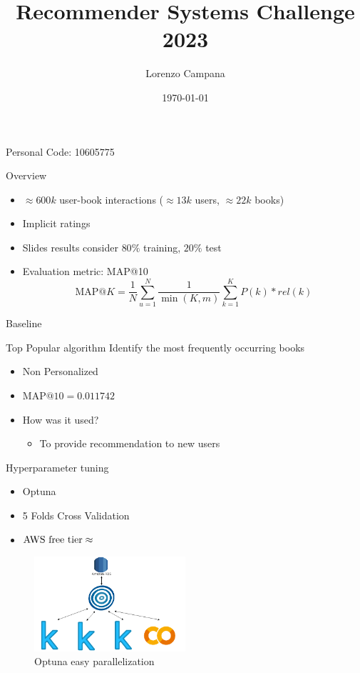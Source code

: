 \documentclass{beamer}
\title{Recommender Systems Challenge 2023}
\author{Lorenzo Campana}
\institute{Politecnico di Milano}
\date{\today}
\begin{document}
\begin{frame}
  \titlepage\center Personal Code: 10605775
\end{frame}

\begin{frame}{Overview}
  \begin{itemize}
    \item $\approx 600k$ user-book interactions ($\approx 13k$ users, $\approx 22k$ books)
    \item Implicit ratings
    \item Slides results consider $80\%$ training, $20\%$ test
    \item Evaluation metric: MAP@10 
      \[
      \text{MAP@}K = \frac{1}{N} \sum_{u=1}^{N} \frac{1}{\min(K, m)} \sum_{k=1}^{K} P(k) * rel(k)
      \]
  \end{itemize}
\end{frame}

\begin{frame}{Baseline}
  \begin{block}{Top Popular algorithm}
    Identify the most frequently occurring books
  \end{block}
  \begin{itemize}
    \item Non Personalized
    \item $\text{MAP@}10=0.011742$
    \item How was it used?
    \begin{itemize}
      \item To provide recommendation to new users
    \end{itemize}
  \end{itemize}
\end{frame}

\begin{frame}{Hyperparameter tuning}
  \begin{itemize}
    \item Optuna
    \item 5 Folds Cross Validation
    \item $\text{\text{AWS free tier}} \approx $ 
  \end{itemize}
  \begin{figure}
    \vspace{1cm}
    \centering
    \includegraphics[width=0.5\textwidth]{diagram_aws_optuna_1.png}
    \caption{Optuna easy parallelization}
  \end{figure}
  
\end{frame}
\end{document}
